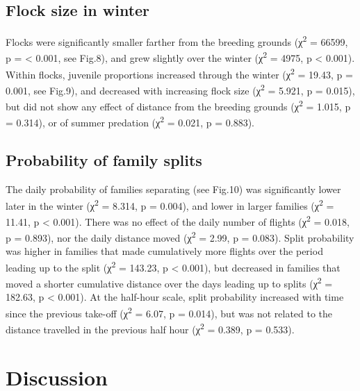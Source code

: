 \documentclass[10pt,twocolumn]{paper}
\begin{document}
\subsection{Flock size in winter}\label{flock-size-in-winter}

Flocks were significantly smaller farther from the breeding grounds
(χ\textsuperscript{2} = 66599, p = \textless{} 0.001, see Fig.8), and
grew slightly over the winter (χ\textsuperscript{2} = 4975, p
\textless{} 0.001). Within flocks, juvenile proportions increased
through the winter (χ\textsuperscript{2} = 19.43, p = 0.001, see Fig.9),
and decreased with increasing flock size (χ\textsuperscript{2} = 5.921,
p = 0.015), but did not show any effect of distance from the breeding
grounds (χ\textsuperscript{2} = 1.015, p = 0.314), or of summer
predation (χ\textsuperscript{2} = 0.021, p = 0.883).

\subsection{Probability of family
splits}\label{probability-of-family-splits}

The daily probability of families separating (see Fig.10) was
significantly lower later in the winter (χ\textsuperscript{2} = 8.314, p
= 0.004), and lower in larger families (χ\textsuperscript{2} = 11.41, p
\textless{} 0.001). There was no effect of the daily number of flights
(χ\textsuperscript{2} = 0.018, p = 0.893), nor the daily distance moved
(χ\textsuperscript{2} = 2.99, p = 0.083). Split probability was higher
in families that made cumulatively more flights over the period leading
up to the split (χ\textsuperscript{2} = 143.23, p \textless{} 0.001),
but decreased in families that moved a shorter cumulative distance over
the days leading up to splits (χ\textsuperscript{2} = 182.63, p
\textless{} 0.001). At the half-hour scale, split probability increased
with time since the previous take-off (χ\textsuperscript{2} = 6.07, p =
0.014), but was not related to the distance travelled in the previous
half hour (χ\textsuperscript{2} = 0.389, p = 0.533).

\section{Discussion}\label{discussion}
\end{document}
